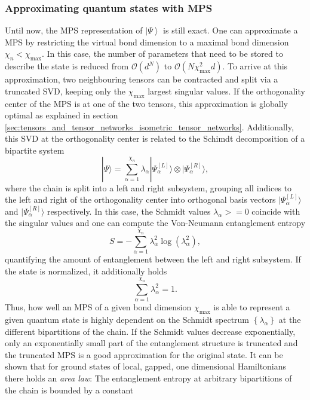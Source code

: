\subsubsection*{\hfil\quad\quad\quad Approximating quantum states with MPS}
Until now, the MPS representation of $\left|\Psi\right\rangle$ is still exact. One can approximate a MPS by restricting the virtual bond dimension to a maximal bond dimension $\chi_n < \chi_\text{max}$. In this case, the number of parameters that need to be stored to describe the state is reduced from $\mathcal{O}\left(d^N\right)$ to $\mathcal{O}\left(N\chi_\text{max}^2 d\right)$. To arrive at this approximation, two neighbouring tensors can be contracted and split via a truncated SVD, keeping only the $\chi_\text{max}$ largest singular values. If the orthogonality center of the MPS is at one of the two tensors, this approximation is globally optimal as explained in section \ref{sec:tensors_and_tensor_networks_isometric_tensor_networks}. Additionally, this SVD at the orthogonality center is related to the Schimdt decomposition of a bipartite system
\begin{equation}
	|\Psi\rangle = \sum_{\alpha=1}^{\chi_n} \lambda_\alpha | \Psi^{[L]}_\alpha\rangle \otimes |\Psi^{[R]}_\alpha\rangle,
\end{equation}
where the chain is split into a left and right subsystem, grouping all indices to the left and right of the orthogonality center into orthogonal basis vectors $|\Psi^{[L]}_\alpha\rangle$ and $|\Psi^{[R]}_\alpha\rangle$ respectively. In this case, the Schmidt values $\lambda_\alpha >= 0$ coincide with the singular values \cite{cite:DMRG_in_the_age_of_MPS} and one can compute the Von-Neumann entanglement entropy
\begin{equation}
	S = -\sum_{\alpha=1}^{\chi_n} \lambda_\alpha^2 \log\left(\lambda_\alpha^2\right),
\end{equation}
quantifying the amount of entanglement between the left and right subsystem. If the state is normalized, it additionally holds
\begin{equation}
	\sum_{\alpha=1}^{\chi_n} \lambda_\alpha^2 = 1.
\end{equation}
Thus, how well an MPS of a given bond dimension $\chi_\text{max}$ is able to represent a given quantum state is highly dependent on the Schmidt spectrum $\left\{\lambda_\alpha\right\}$ at the different bipartitions of the chain. If the Schmidt values decrease exponentially, only an exponentially small part of the entanglement structure is truncated and the truncated MPS is a good approximation for the original state. It can be shown \cite{cite:area_law_1D_proof, cite:area_laws_review} that for ground states of local, gapped, one dimensional Hamiltonians there holds an \textit{area law}: The entanglement entropy at arbitrary bipartitions of the chain is bounded by a constant
